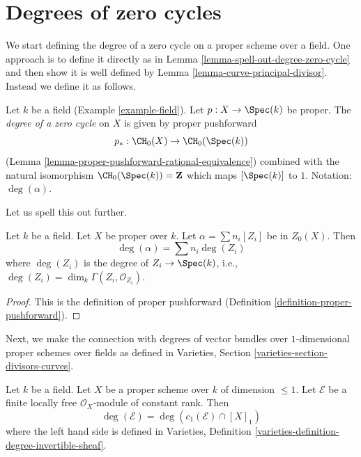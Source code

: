 \section{Degrees of zero cycles}
\label{section-degree-zero-cycles}

\noindent
We start defining the degree of a zero cycle on a proper scheme over a field.
One approach is to define it directly as in
Lemma \ref{lemma-spell-out-degree-zero-cycle} and then show
it is well defined by
Lemma \ref{lemma-curve-principal-divisor}.
Instead we define it as follows.

\begin{definition}
\label{definition-degree-zero-cycle}
Let $k$ be a field (Example \ref{example-field}). Let $p : X \to \Spec(k)$
be proper. The {\it degree of a zero cycle} on $X$ is given by proper
pushforward
$$
p_* : \CH_0(X) \to \CH_0(\Spec(k))
$$
(Lemma \ref{lemma-proper-pushforward-rational-equivalence})
combined with the natural isomorphism $\CH_0(\Spec(k)) = \mathbf{Z}$
which maps $[\Spec(k)]$ to $1$. Notation: $\deg(\alpha)$.
\end{definition}

\noindent
Let us spell this out further.

\begin{lemma}
\label{lemma-spell-out-degree-zero-cycle}
Let $k$ be a field. Let $X$ be proper over $k$. Let $\alpha = \sum n_i[Z_i]$
be in $Z_0(X)$. Then
$$
\deg(\alpha) = \sum n_i\deg(Z_i)
$$
where $\deg(Z_i)$ is the degree of $Z_i \to \Spec(k)$, i.e.,
$\deg(Z_i) = \dim_k \Gamma(Z_i, \mathcal{O}_{Z_i})$.
\end{lemma}

\begin{proof}
This is the definition of proper pushforward
(Definition \ref{definition-proper-pushforward}).
\end{proof}

\noindent
Next, we make the connection with degrees of vector bundles
over $1$-dimensional proper schemes over fields as defined in
Varieties, Section \ref{varieties-section-divisors-curves}.

\begin{lemma}
\label{lemma-degree-vector-bundle}
Let $k$ be a field. Let $X$ be a proper scheme over $k$ of dimension $\leq 1$.
Let $\mathcal{E}$ be a finite locally free $\mathcal{O}_X$-module of constant
rank. Then
$$
\deg(\mathcal{E}) = \deg(c_1(\mathcal{E}) \cap [X]_1)
$$
where the left hand side is defined in
Varieties, Definition \ref{varieties-definition-degree-invertible-sheaf}.
\end{lemma}

